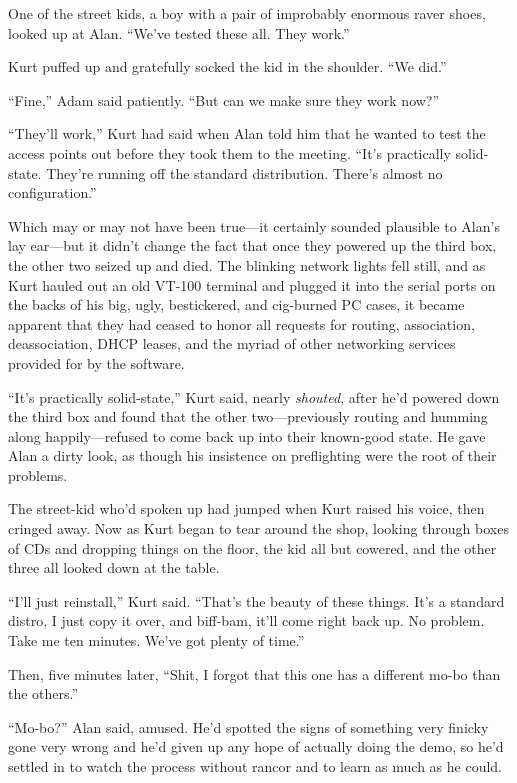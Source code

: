 \documentclass{article}
\begin{document}
One of the street kids, a boy with a pair of improbably enormous raver
shoes, looked up at Alan.  ``We've tested these all.  They work.''

Kurt puffed up and gratefully socked the kid in the shoulder.  ``We
did.''

``Fine,'' Adam said patiently.  ``But can we make sure they work
now?''

``They'll work,'' Kurt had said when Alan told him that he wanted to
test the access points out before they took them to the meeting. 
``It's practically solid-state.  They're running off the standard
distribution.  There's almost no configuration.''

Which may or may not have been true---it certainly sounded plausible
to Alan's lay ear---but it didn't change the fact that once they
powered up the third box, the other two seized up and died.  The
blinking network lights fell still, and as Kurt hauled out an old
VT-100 terminal and plugged it into the serial ports on the backs of
his big, ugly, bestickered, and cig-burned PC cases, it became
apparent that they had ceased to honor all requests for routing,
association, deassociation, DHCP leases, and the myriad of other
networking services provided for by the software.

``It's practically solid-state,'' Kurt said, nearly \textit{shouted},
after he'd powered down the third box and found that the other
two---previously routing and humming along happily---refused to come
back up into their known-good state.  He gave Alan a dirty look, as
though his insistence on preflighting were the root of their problems.

The street-kid who'd spoken up had jumped when Kurt raised his voice,
then cringed away.  Now as Kurt began to tear around the shop, looking
through boxes of CDs and dropping things on the floor, the kid all but
cowered, and the other three all looked down at the table.

``I'll just reinstall,'' Kurt said.  ``That's the beauty of these
things.  It's a standard distro, I just copy it over, and biff-bam,
it'll come right back up.  No problem.  Take me ten minutes.  We've
got plenty of time.''

Then, five minutes later, ``Shit, I forgot that this one has a
different mo-bo than the others.''

``Mo-bo?'' Alan said, amused.  He'd spotted the signs of something
very finicky gone very wrong and he'd given up any hope of actually
doing the demo, so he'd settled in to watch the process without rancor
and to learn as much as he could.
\end{document}
